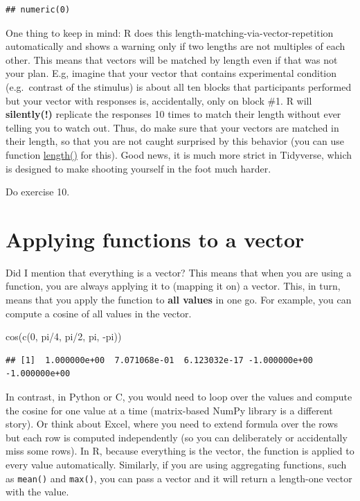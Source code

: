 \documentclass[
]{book}
\newenvironment{Shaded}{\begin{snugshade}}{\end{snugshade}}
\newcommand{\DecValTok}[1]{\textcolor[rgb]{0.00,0.00,0.81}{#1}}
\newcommand{\FunctionTok}[1]{\textcolor[rgb]{0.00,0.00,0.00}{#1}}
\newcommand{\NormalTok}[1]{#1}
\newcommand{\SpecialCharTok}[1]{\textcolor[rgb]{0.00,0.00,0.00}{#1}}
\begin{document}
\begin{verbatim}
## numeric(0)
\end{verbatim}

One thing to keep in mind: R does this length-matching-via-vector-repetition automatically and shows a warning only if two lengths are not multiples of each other. This means that vectors will be matched by length even if that was not your plan. E.g, imagine that your vector that contains experimental condition (e.g.~contrast of the stimulus) is about all ten blocks that participants performed but your vector with responses is, accidentally, only on block \#1. R will \textbf{silently(!)} replicate the responses 10 times to match their length without ever telling you to watch out. Thus, do make sure that your vectors are matched in their length, so that you are not caught surprised by this behavior (you can use function \href{https://www.rdocumentation.org/packages/base/versions/3.6.2/topics/length}{length()} for this). Good news, it is much more strict in Tidyverse, which is designed to make shooting yourself in the foot much harder.

Do exercise 10.

\hypertarget{applying-functions-to-a-vector}{%
\section{Applying functions to a vector}\label{applying-functions-to-a-vector}}

Did I mention that everything is a vector? This means that when you are using a function, you are always applying it to (mapping it on) a vector. This, in turn, means that you apply the function to \textbf{all values} in one go. For example, you can compute a cosine of all values in the vector.

\begin{Shaded}
\begin{Highlighting}[]
\FunctionTok{cos}\NormalTok{(}\FunctionTok{c}\NormalTok{(}\DecValTok{0}\NormalTok{, pi}\SpecialCharTok{/}\DecValTok{4}\NormalTok{, pi}\SpecialCharTok{/}\DecValTok{2}\NormalTok{, pi, }\SpecialCharTok{{-}}\NormalTok{pi))}
\end{Highlighting}
\end{Shaded}

\begin{verbatim}
## [1]  1.000000e+00  7.071068e-01  6.123032e-17 -1.000000e+00 -1.000000e+00
\end{verbatim}

In contrast, in Python or C, you would need to loop over the values and compute the cosine for one value at a time (matrix-based NumPy library is a different story). Or think about Excel, where you need to extend formula over the rows but each row is computed independently (so you can deliberately or accidentally miss some rows). In R, because everything is the vector, the function is applied to every value automatically. Similarly, if you are using aggregating functions, such as \texttt{mean()} and \texttt{max()}, you can pass a vector and it will return a length-one vector with the value.
\end{document}
